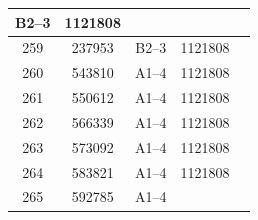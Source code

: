\documentclass[UTF8,10pt,a4paper,fontset=fandol]{ctexart}
\newcommand{\fieldvalue}[1]{#1}
\begin{document}
\begin{tabular}{|c|c|c|c|p{2.5cm}|}
\fieldvalue{B2--3} &
\fieldvalue{1121808} & \\
\hline
\fieldvalue{259} &
\fieldvalue{237953} &
\fieldvalue{B2--3} &
\fieldvalue{1121808} & \\
\hline
\fieldvalue{260} &
\fieldvalue{543810} &
\fieldvalue{A1--4} &
\fieldvalue{1121808} & \\
\hline
\fieldvalue{261} &
\fieldvalue{550612} &
\fieldvalue{A1--4} &
\fieldvalue{1121808} & \\
\hline
\fieldvalue{262} &
\fieldvalue{566339} &
\fieldvalue{A1--4} &
\fieldvalue{1121808} & \\
\hline
\fieldvalue{263} &
\fieldvalue{573092} &
\fieldvalue{A1--4} &
\fieldvalue{1121808} & \\
\hline
\fieldvalue{264} &
\fieldvalue{583821} &
\fieldvalue{A1--4} &
\fieldvalue{1121808} & \\
\hline
\fieldvalue{265} &
\fieldvalue{592785} &
\fieldvalue{A1--4} &

\end{tabular}
\end{document}
